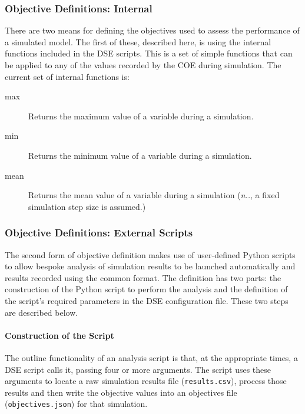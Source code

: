 \subsubsection*{Objective Definitions: Internal}\label{sec:dse:overview:objectivesinternal}
There are two means for defining the objectives used to assess the performance of a simulated model.  The first of these, described here, is using the internal functions included in the DSE scripts.  This is a set of simple functions that can be applied to any of the values recorded by the COE during simulation.  The current set of internal functions is:
%
%
%
\begin{description}
	\item[max] Returns the maximum value of a variable during a simulation.
	\item[min] Returns the minimum value of a variable during a simulation.
	\item[mean] Returns the mean value of a variable during a simulation (\emph{n.\@b.\@}, a fixed simulation step size is assumed.)
\end{description}
%
%

\subsubsection*{Objective Definitions: External Scripts}\label{sec:dse:overview:objectivesexternal}

The second form of objective definition makes use of user-defined Python scripts to allow bespoke analysis of simulation results to be launched automatically and results recorded using the common format.  The definition has two parts: the construction of the Python script to perform the analysis and the definition of the script's required parameters in the DSE configuration file.  These two steps are described below.

\paragraph{Construction of the Script}

The outline functionality of an analysis script is that, at the appropriate times, a DSE script calls it, passing four or more arguments.  The script uses these arguments to locate a raw simulation results file (\texttt{results.csv}), process those results and then write the objective values into an objectives file (\texttt{objectives.json}) for that simulation.  

